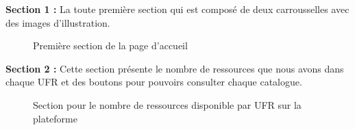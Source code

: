 \textbf{Section 1 :}
La toute première section qui est composé de deux carrousselles avec des images d'illustration.
\begin{figure}[H]%
    \center%
    \setlength{\fboxsep}{5pt}%
    \setlength{\fboxrule}{0.5pt}%
    \caption{Première section de la page d'accueil}%
\end{figure}
\par 

\textbf{Section 2 :}
Cette section présente le nombre de ressources que nous avons dans chaque UFR et des boutons pour pouvoirs consulter chaque catalogue.

\begin{figure}[H]%
    \center%
    \setlength{\fboxsep}{5pt}%
    \setlength{\fboxrule}{0.5pt}%
    \caption{Section pour le nombre de ressources disponible par UFR sur la plateforme }%
\end{figure}
\par

